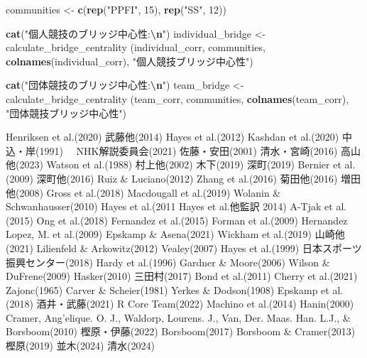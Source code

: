 \documentclass[12pt,a4paper,xelatex,ja=standard]{bxjsarticle}
\newenvironment{Shaded}{\begin{snugshade}}{\end{snugshade}}
\newcommand{\DecValTok}[1]{\textcolor[rgb]{0.00,0.00,0.81}{#1}}
\newcommand{\FunctionTok}[1]{\textcolor[rgb]{0.13,0.29,0.53}{\textbf{#1}}}
\newcommand{\NormalTok}[1]{#1}
\newcommand{\OtherTok}[1]{\textcolor[rgb]{0.56,0.35,0.01}{#1}}
\newcommand{\SpecialCharTok}[1]{\textcolor[rgb]{0.81,0.36,0.00}{\textbf{#1}}}
\newcommand{\StringTok}[1]{\textcolor[rgb]{0.31,0.60,0.02}{#1}}
\begin{document}
\begin{Shaded}
\begin{Highlighting}[]
\NormalTok{communities }\OtherTok{\textless{}{-}} \FunctionTok{c}\NormalTok{(}\FunctionTok{rep}\NormalTok{(}\StringTok{"PPFI"}\NormalTok{, }\DecValTok{15}\NormalTok{), }\FunctionTok{rep}\NormalTok{(}\StringTok{"SS"}\NormalTok{, }\DecValTok{12}\NormalTok{)) }

\FunctionTok{cat}\NormalTok{(}\StringTok{"個人競技のブリッジ中心性:}\SpecialCharTok{\textbackslash{}n}\StringTok{"}\NormalTok{)}
\NormalTok{individual\_bridge }\OtherTok{\textless{}{-}}\NormalTok{ calculate\_bridge\_centrality}
\NormalTok{(individual\_corr, communities, }
  \FunctionTok{colnames}\NormalTok{(individual\_corr), }\StringTok{"個人競技ブリッジ中心性"}\NormalTok{)}

\FunctionTok{cat}\NormalTok{(}\StringTok{"団体競技のブリッジ中心性:}\SpecialCharTok{\textbackslash{}n}\StringTok{"}\NormalTok{)}
\NormalTok{team\_bridge }\OtherTok{\textless{}{-}}\NormalTok{ calculate\_bridge\_centrality}
\NormalTok{(team\_corr, communities, }
\FunctionTok{colnames}\NormalTok{(team\_corr), }\StringTok{"団体競技ブリッジ中心性"}\NormalTok{)}
\end{Highlighting}
\end{Shaded}

\clearpage

Henriksen et al.(2020) 武藤他(2014) Hayes et al.(2012) Kashdan et
al.(2020) 中込・岸(1991) 　NHK解説委員会(2021) 佐藤・安田(2001)
清水・宮崎(2016) 高山他(2023) Watson et al.(1988) 村上他(2002)
木下(2019) 深町(2019) Bernier et al.(2009) 深町他(2016) Ruiz \&
Luciano(2012) Zhang et al.(2016) 菊田他(2016) 増田他(2008) Gross et
al.(2018) Macdougall et al.(2019) Wolanin \& Schwanhausser(2010) Hayes
et al.(2011 Hayes et al.他監訳 2014) A-Tjak et al.(2015) Ong et
al.(2018) Fernandez et al.(2015) Forman et al.(2009) Hernandez Lopez, M.
et al.(2009) Epskamp \& Asena(2021) Wickham et al.(2019) 山崎他(2021)
Lilienfeld \& Arkowitz(2012) Vealey(2007) Hayes et al.(1999)
日本スポーツ振興センター(2018) Hardy et al.(1996) Gardner \& Moore(2006)
Wilson \& DuFrene(2009) Hasker(2010) 三田村(2017) Bond et al.(2011)
Cherry et al.(2021) Zajonc(1965) Carver \& Scheier(1981) Yerkes \&
Dodson(1908) Epskamp et al.(2018) 酒井・武藤(2021) R Core Team(2022)
Machino et al.(2014) Hanin(2000) Cramer, Ang'elique. O. J., Waldorp,
Lourens. J., Van, Der. Maas. Han. L.J., \& Borsboom(2010)
樫原・伊藤(2022) Borsboom(2017) Borsboom \& Cramer(2013) 樫原(2019)
並木(2024) 清水(2024)
\end{document}
